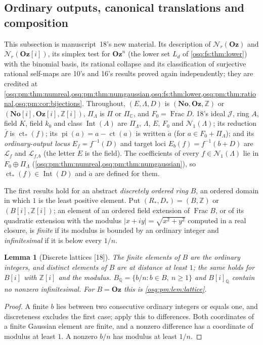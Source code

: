 \documentclass[11pt,letterpaper]{article}
\numberwithin{equation}{section}
\newtheorem{lemma}[lemma]{Lemma}
\theoremstyle{definition}
\theoremstyle{remark}
\theoremstyle{plain}
\newcommand{\No}{\mathbf{No}}
\newcommand{\Oz}{\mathbf{Oz}}
\newcommand{\SC}{\No[i]}
\newcommand{\GOz}{\Oz[i]}
\newcommand{\Z}{\mathbb Z}
\newcommand{\Q}{\mathbb Q}
\newcommand{\C}{\mathbb C}
\newcommand{\ct}{\operatorname{ct}}
\newcommand{\Frac}{\operatorname{Frac}}
\newcommand{\Int}{\operatorname{Int}}
\newcommand{\Num}{\mathscr N}
\newcommand{\src}[1]{\textup{\textsf{[#1]}}}
\begin{document}
\subsection{Ordinary outputs, canonical translations and composition}\label{osq:or:sub:outputs}

This subsection is manuscript~18's new material. Its description of $\Num_r(\Oz)$ and $\Num_r(\GOz)$, its simplex test for $\Oz^n$ (the
lower set $L_d$ of \cref{osq:fs:thm:lower}) with the binomial basis, its rational collapse and its classification of surjective rational
self-maps are 10's and 16's results proved again independently; they are credited at
\cref{osq:pm:thm:numreal,osq:pm:thm:numgaussian,osq:fs:thm:lower,osq:pm:thm:rational,osq:pm:cor:bijections}. Throughout,
$(E,\Lambda,D)$ is $(\No,\Oz,\Z)$ or $(\SC,\GOz,\Z[i])$, $\Pi_\Lambda$ is $\Pi$ or $\Pi_\C$, and $F_0=\Frac D$. 18's ideal $\mathcal J$, ring $A$,
field $K$, field $k_0$ and class $\Int(A)$ are $\Pi_\Lambda$, $\Lambda$, $E$, $F_0$ and $\Num_1(\Lambda)$; its reduction $\overline f$ is $\ct_*(f)$; its
$\operatorname{pi}(a)=a-\ct(a)$ is written $\mathring a$ (for $a\in F_0+\Pi_\Lambda$); and its \emph{ordinary-output locus}
$E_f=f^{-1}(D)$ and target loci $E_b(f)=f^{-1}(b+D)$ are $\mathcal L_f$ and $\mathcal L_{f,b}$ (the letter $E$ is the field). The coefficients of every
$f\in\Num_1(\Lambda)$ lie in $F_0\oplus\Pi_\Lambda$ (\cref{osq:pm:thm:numreal,osq:pm:thm:numgaussian}), so $\ct_*(f)\in\Int(D)$ and $\mathring a$ are
defined for them.

The first results hold for an abstract \emph{discretely ordered ring} $B$, an ordered domain in which $1$ is the least positive element. Put
$(R_*,D_*)=(B,\Z)$ or $(B[i],\Z[i])$; an element of an ordered field extension of $\Frac B$, or of its quadratic extension with the modulus
$|x+iy|=\sqrt{x^2+y^2}$ computed in a real closure, is \emph{finite} if its modulus is bounded by an ordinary integer and \emph{infinitesimal} if it
is below every $1/n$.

\begin{lemma}[Discrete lattices \src{18}]\label{osq:or:lem:discrete}
The finite elements of $B$ are the ordinary integers, and distinct elements of $B$ are at distance at least $1$; the same holds for $B[i]$ with
$\Z[i]$ and the modulus. $B_\Q=\{b/n:b\in B,\ n\ge1\}$ and $B[i]_\Q$ contain no nonzero infinitesimal. For $B=\Oz$ this is
\cref{osq:pm:lem:lattice}.
\end{lemma}
\begin{proof}
A finite $b$ lies between two consecutive ordinary integers or equals one, and discreteness excludes the first case; apply this to differences.
Both coordinates of a finite Gaussian element are finite, and a nonzero difference has a coordinate of modulus at least $1$. A nonzero $b/n$ has
modulus at least $1/n$.
\end{proof}
\end{document}
